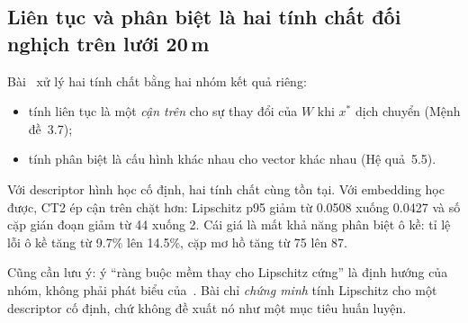\documentclass[11pt,a4paper]{article}
\begin{document}
\subsection{Liên tục và phân biệt là hai tính chất đối nghịch trên lưới 20\,m}
Bài~\cite{huu2026} xử lý hai tính chất bằng hai nhóm kết quả riêng:
\begin{itemize}
\item tính liên tục là một \emph{cận trên} cho sự thay đổi của $W$ khi $x^*$ dịch chuyển (Mệnh đề~3.7);
\item tính phân biệt là cấu hình khác nhau cho vector khác nhau (Hệ quả~5.5).
\end{itemize}
Với descriptor hình học cố định, hai tính chất cùng tồn tại. Với embedding học được, CT2 ép cận trên chặt hơn: Lipschitz p95 giảm từ 0.0508 xuống 0.0427 và số cặp gián đoạn giảm từ 44 xuống 2. Cái giá là mất khả năng phân biệt ô kề: tỉ lệ lỗi ô kề tăng từ 9.7\% lên 14.5\%, cặp mơ hồ tăng từ 75 lên 87.

Cũng cần lưu ý: ý ``ràng buộc mềm thay cho Lipschitz cứng'' là định hướng của nhóm, không phải phát biểu của~\cite{huu2026}. Bài chỉ \emph{chứng minh} tính Lipschitz cho một descriptor cố định, chứ không đề xuất nó như một mục tiêu huấn luyện.
\end{document}
